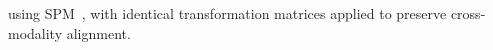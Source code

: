 using SPM~\cite{spm,friston1995spatial}, with identical transformation matrices applied to preserve cross-modality alignment.

